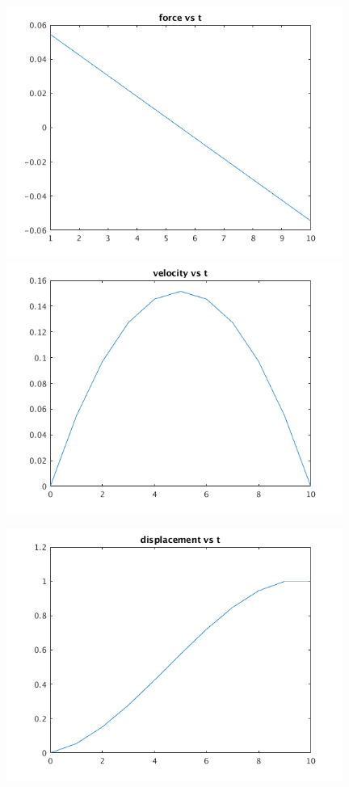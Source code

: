 \documentclass[12pt,letter]{article}
\begin{document}
\begin{enumerate}
\begin{itemize}
\begin{align*}
    \end{align*}
    \begin{figure}[H]
      \centering
      \includegraphics[width=11cm]{q9/part_a_plot_1.png}
      \includegraphics[width=11cm]{q9/part_a_plot_2.png}
    \end{figure}
    \begin{figure}[H]
      \centering
      \includegraphics[width=11cm]{q9/part_a_plot_3.png}
    \end{figure}


\end{itemize}
\end{enumerate}
\end{document}
